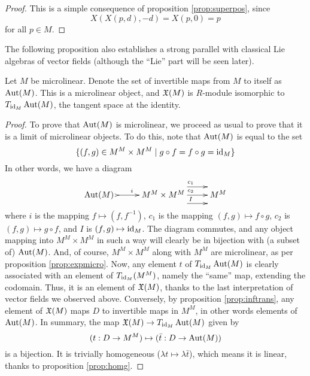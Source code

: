 \begin{proof}
  This is a simple consequence of proposition \ref{prop:superpos}, since
  \begin{equation*}
    X(X(p,d),-d)=X(p,0)=p
  \end{equation*}
  for all \( p\in M \).
\end{proof}

The following proposition also establishes a strong parallel with classical Lie algebras of vector fields (although the ``Lie'' part will be seen later).

\begin{proposition}
  Let \( M \) be microlinear. Denote the set of invertible maps from \( M \) to itself as \( \operatorname{Aut}(M) \). This is a microlinear object, and \( \mathfrak X(M) \) is \( R \)-module isomorphic to \( T_{\operatorname{id}_M}\operatorname{Aut}(M) \), the tangent space at the identity.
\end{proposition}

\begin{proof}
  To prove that \( \operatorname{Aut}(M) \) is microlinear, we proceed as usual to prove that it is a limit of microlinear objects. To do this, note that \( \operatorname{Aut}(M) \) is equal to the set
  \begin{equation*}
    \{ (f,g) \in M^M\times M^M \mid g\circ f = f \circ g = \operatorname{id}_M \}
  \end{equation*}
  In other words, we have a diagram
  \begin{equation*}
    \xymatrix{
      {\aut(M)\,\,} \ar@{>->}[r]^{i} & M^M\times M^M \ar@<1em>[r]^{c_1} \ar[r]^{c_2}\ar@<-1em>[r]^{I} & M^M
    }
  \end{equation*}
  where \( i \) is the mapping \( f\mapsto (f,f^{-1}) \), \( c_1 \) is the mapping \( (f,g)\mapsto f\circ g \), \( c_2 \) is \( (f,g)\mapsto g\circ f \), and \( I \) is \( (f,g)\mapsto \operatorname{id}_M \). The diagram commutes, and any object mapping into \( M^M\times M^M \) in such a way will clearly be in bijection with (a subset of) \( \operatorname{Aut}(M) \). And, of course, \( M^M\times M^M \) along with \( M^M \) are microlinear, as per proposition \ref{prop:expmicro}. Now, any element \( t \) of \( T_{\operatorname{id}_M}\operatorname{Aut}(M) \) is clearly associated with an element of \( T_{\operatorname{id}_M}(M^M) \), namely the ``same'' map, extending the codomain. Thus, it is an element of \( \mathfrak X(M) \), thanks to the last interpretation of vector fields we observed above. Conversely, by proposition \ref{prop:inftrans}, any element of \( \mathfrak X(M) \) maps \( D \) to invertible maps in \( M^M \), in other words elements of \( \operatorname{Aut}(M) \). In summary, the map \( \mathfrak X(M) \to T_{\operatorname{id}_M}\operatorname{Aut}(M) \) given by
  \begin{equation*}
    (t:D\to M^M) \mapsto (\bar t:D\to \operatorname{Aut}(M))
  \end{equation*}
  is a bijection. It is trivially homogeneous (\( \lambda t \mapsto \lambda \bar t \)), which means it is linear, thanks to proposition \ref{prop:homg}.
\end{proof}

